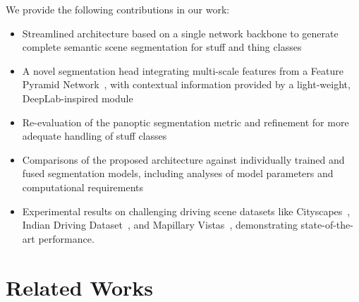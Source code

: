 \documentclass[10pt,twocolumn,letterpaper]{article}
\begin{document}
We provide the following contributions in our work:
\begin{itemize}
\item Streamlined architecture based on a single network backbone to generate complete semantic scene segmentation for stuff and thing classes
	\item A novel segmentation head integrating multi-scale features from a Feature Pyramid Network~\cite{Lin2016}, with contextual information provided by a light-weight, DeepLab-inspired module
\item Re-evaluation of the panoptic segmentation metric and refinement for more adequate handling of stuff classes
\item Comparisons of the proposed architecture against individually trained and fused segmentation models, including analyses of model parameters and computational requirements
\item Experimental results on challenging driving scene datasets like Cityscapes~\cite{Cordts2016},  Indian Driving Dataset~\cite{Varma19}, and Mapillary Vistas~\cite{Neuhold2017}, demonstrating 	state-of-the-art performance.
\end{itemize}


\section{Related Works}
\end{document}

